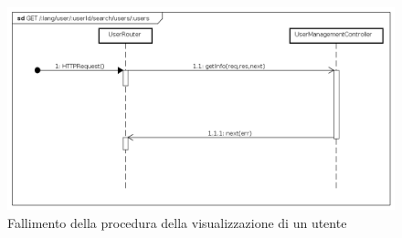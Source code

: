 \begin{itemize}
\begin{figure}[ht]
	\centering
	\includegraphics[scale=0.45]{UML/DiagrammiDiSequenza/Back-end/GET__lang_user__userId_search_users__users_failure.png}
	\caption{Fallimento della procedura della visualizzazione di un utente}
\end{figure}
\FloatBarrier

\end{itemize}


